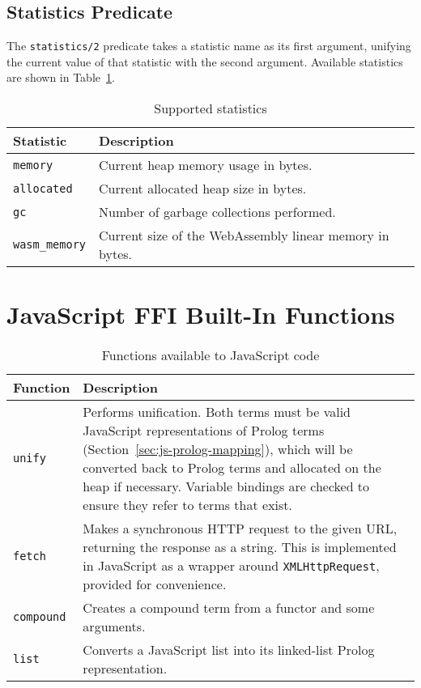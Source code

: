 \begin{appendices}
\section{Statistics Predicate}

The \texttt{statistics/2} predicate takes a statistic name as its first argument, unifying the current value of that statistic with the second argument. Available statistics are shown in Table~\ref{table:statistics}.

\begin{table}
\centering
\begin{tabular}{ll}
\hline
\textbf{Statistic} & \textbf{Description} \\
\hline
\texttt{memory} & Current heap memory usage in bytes. \\
\texttt{allocated} & Current allocated heap size in bytes. \\
\texttt{gc} & Number of garbage collections performed. \\
\texttt{wasm\_memory} & Current size of the WebAssembly linear memory in bytes. \\
\hline
\end{tabular}
\caption{Supported statistics}
\label{table:statistics}
\end{table}

\chapter{JavaScript FFI Built-In Functions}

\label{appendix:js-ffi}

\begin{table}[H]
\centering
\begin{tabular}{lp{12cm}}
\hline
\textbf{Function} & \textbf{Description} \\
\hline
\texttt{unify} & Performs unification. Both terms must be valid JavaScript representations of Prolog terms (Section~\ref{sec:js-prolog-mapping}), which will be converted back to Prolog terms and allocated on the heap if necessary. Variable bindings are checked to ensure they refer to terms that exist. \\
\texttt{fetch} & Makes a synchronous HTTP request to the given URL, returning the response as a string. This is implemented in JavaScript as a wrapper around \texttt{XMLHttpRequest}, provided for convenience. \\
\texttt{compound} & Creates a compound term from a functor and some arguments. \\
\texttt{list} & Converts a JavaScript list into its linked-list Prolog representation. \\
\hline
\end{tabular}
\caption{Functions available to JavaScript code}
\label{tab:js-ffi}
\end{table}


\end{appendices}
